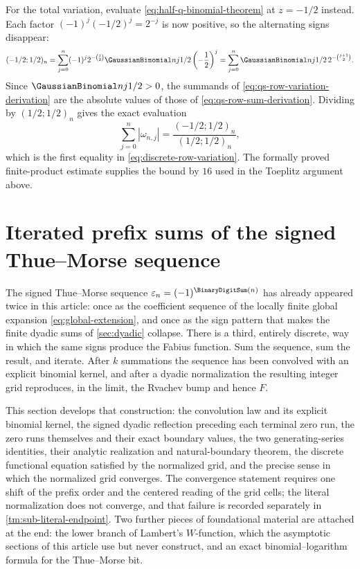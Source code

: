 \documentclass[11pt,oneside]{article}
\theoremstyle{definition}
\theoremstyle{remark}
\begin{document}
For the total variation, evaluate \eqref{eq:half-q-binomial-theorem} at $z=-1/2$ instead.
Each factor $(-1)^j(-1/2)^j=2^{-j}$ is now positive, so the alternating signs disappear:
\begin{equation}
 (-1/2;1/2)_n
 =\sum_{j=0}^{n}(-1)^j2^{-\binom j2}\GaussianBinomial nj{1/2}\left(-\frac12\right)^{j}
 =\sum_{j=0}^{n}\GaussianBinomial nj{1/2}\,2^{-\binom{j+1}2}.        \label{eq:qs-row-variation-derivation}
\end{equation}
Since $\GaussianBinomial nj{1/2}>0$, the summands of \eqref{eq:qs-row-variation-derivation} are the
absolute values of those of \eqref{eq:qs-row-sum-derivation}.  Dividing by $(1/2;1/2)_n$
gives the exact evaluation
\begin{equation}
 \sum_{j=0}^{n}|\omega_{n,j}|=\frac{(-1/2;1/2)_n}{(1/2;1/2)_n}, \label{eq:qs-row-variation-exact}
\end{equation}
which is the first equality in \eqref{eq:discrete-row-variation}.  The formally proved
finite-product estimate supplies the bound by $16$ used in the Toeplitz argument above.

\section{Iterated prefix sums of the signed Thue--Morse sequence}
\label{tm:sec-prefix}

The signed Thue--Morse sequence $\varepsilon_n=(-1)^{\BinaryDigitSum(n)}$ has already appeared twice in
this article: once as the coefficient sequence of the locally finite global expansion
\eqref{eq:global-extension}, and once as the sign pattern that makes the finite dyadic sums
of \cref{sec:dyadic} collapse.  There is a third, entirely discrete, way in which
the same signs produce the Fabius function.  Sum the sequence, sum the result, and iterate.
After $k$ summations the sequence has been convolved with an explicit binomial kernel, and
after a dyadic normalization the resulting integer grid reproduces, in the
limit, the Rvachev bump and hence $F$.

This section develops that construction: the convolution law and its explicit binomial
kernel, the signed dyadic reflection preceding each terminal zero run, the zero runs
themselves and their exact boundary values, the two generating-series identities, their
analytic realization and natural-boundary theorem, the discrete functional equation
satisfied by the normalized grid, and the
precise sense in which the normalized grid converges.  The convergence statement requires
one shift of the prefix order and the centered reading of the grid cells; the literal
normalization does not converge, and that failure is recorded separately in
\cref{tm:sub-literal-endpoint}.  Two further pieces of foundational material are attached at
the end: the lower branch of Lambert's $W$-function, which the asymptotic sections of this
article use but never construct, and an exact binomial--logarithm formula for the
Thue--Morse bit.
\end{document}
